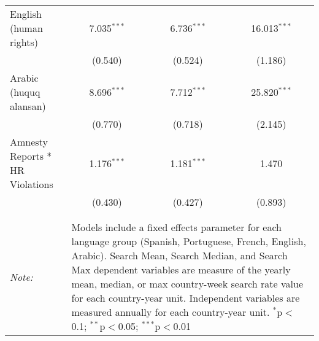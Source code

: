 \begin{table}[!htbp]
\begin{tabular}{@{\extracolsep{5pt}}lccc}
  English (human rights) & 7.035$^{***}$ & 6.736$^{***}$ & 16.013$^{***}$ \\ 
  & (0.540) & (0.524) & (1.186) \\ 
  Arabic (huquq alansan) & 8.696$^{***}$ & 7.712$^{***}$ & 25.820$^{***}$ \\ 
  & (0.770) & (0.718) & (2.145) \\ 
  Amnesty Reports * HR Violations & 1.176$^{***}$ & 1.181$^{***}$ & 1.470 \\ 
  & (0.430) & (0.427) & (0.893) \\ 
 \hline \\[-1.8ex] 
\hline 
\hline \\[-1.8ex] 
\textit{Note:}  & \multicolumn{3}{l}{\parbox[t]{8cm}{Models include a fixed effects parameter for each language group (Spanish, Portuguese, French, English, Arabic). Search Mean, Search Median, and Search Max dependent variables are measure of the yearly mean, median, or max country-week search rate value for each country-year unit. Independent variables are measured annually for each country-year unit. $^{*}$p$<$0.1; $^{**}$p$<$0.05; $^{***}$p$<$0.01}} \\ 
\end{tabular} 
\end{table} 
